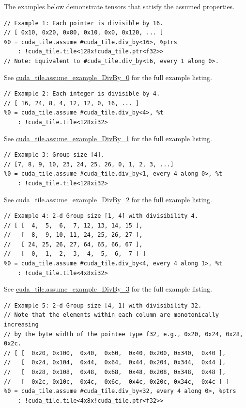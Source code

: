 \documentclass{article}
\begin{document}
The examples below demonstrate tensors that satisfy the assumed properties.


\begin{lstlisting}
// Example 1: Each pointer is divisible by 16.
// [ 0x10, 0x20, 0x80, 0x10, 0x0, 0x120, ... ]
%0 = cuda_tile.assume #cuda_tile.div_by<16>, %ptrs
    : !cuda_tile.tile<128x!cuda_tile.ptr<f32>>
// Note: Equivalent to #cuda_tile.div_by<16, every 1 along 0>.
\end{lstlisting}

See \href{https://docs.nvidia.com/cuda/tile-ir/latest/sections/appendix.html#example-cuda-tile-assume-example-divby-0}{cuda\_tile.assume\_example\_DivBy\_0} for the full example listing.


\begin{lstlisting}
// Example 2: Each integer is divisible by 4.
// [ 16, 24, 8, 4, 12, 12, 0, 16, ... ]
%0 = cuda_tile.assume #cuda_tile.div_by<4>, %t
    : !cuda_tile.tile<128xi32>
\end{lstlisting}

See \href{https://docs.nvidia.com/cuda/tile-ir/latest/sections/appendix.html#example-cuda-tile-assume-example-divby-1}{cuda\_tile.assume\_example\_DivBy\_1} for the full example listing.


\begin{lstlisting}
// Example 3: Group size [4].
// [7, 8, 9, 10, 23, 24, 25, 26, 0, 1, 2, 3, ...]
%0 = cuda_tile.assume #cuda_tile.div_by<1, every 4 along 0>, %t
    : !cuda_tile.tile<128xi32>
\end{lstlisting}

See \href{https://docs.nvidia.com/cuda/tile-ir/latest/sections/appendix.html#example-cuda-tile-assume-example-divby-2}{cuda\_tile.assume\_example\_DivBy\_2} for the full example listing.


\begin{lstlisting}
// Example 4: 2-d Group size [1, 4] with divisibility 4.
// [ [  4,  5,  6,  7, 12, 13, 14, 15 ],
//   [  8,  9, 10, 11, 24, 25, 26, 27 ],
//   [ 24, 25, 26, 27, 64, 65, 66, 67 ],
//   [  0,  1,  2,  3,  4,  5,  6,  7 ] ]
%0 = cuda_tile.assume #cuda_tile.div_by<4, every 4 along 1>, %t
    : !cuda_tile.tile<4x8xi32>
\end{lstlisting}

See \href{https://docs.nvidia.com/cuda/tile-ir/latest/sections/appendix.html#example-cuda-tile-assume-example-divby-3}{cuda\_tile.assume\_example\_DivBy\_3} for the full example listing.


\begin{lstlisting}
// Example 5: 2-d Group size [4, 1] with divisibility 32.
// Note that the elements within each column are monotonically increasing
// by the byte width of the pointee type f32, e.g., 0x20, 0x24, 0x28, 0x2c.
// [ [  0x20, 0x100,  0x40,  0x60,  0x40, 0x200, 0x340,  0x40 ],
//   [  0x24, 0x104,  0x44,  0x64,  0x44, 0x204, 0x344,  0x44 ],
//   [  0x28, 0x108,  0x48,  0x68,  0x48, 0x208, 0x348,  0x48 ],
//   [  0x2c, 0x10c,  0x4c,  0x6c,  0x4c, 0x20c, 0x34c,  0x4c ] ]
%0 = cuda_tile.assume #cuda_tile.div_by<32, every 4 along 0>, %ptrs
    : !cuda_tile.tile<4x8x!cuda_tile.ptr<f32>>
\end{lstlisting}
\end{document}

